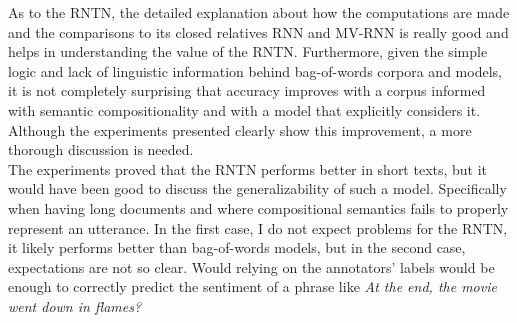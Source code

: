 \documentclass[11pt,a4paper]{article}
\begin{document}
As to the RNTN, the detailed explanation about how the computations are made and the comparisons to its closed relatives RNN and MV-RNN is really good and helps in understanding the value of the RNTN. Furthermore, given the simple logic and lack of linguistic information behind bag-of-words corpora and models, it is not completely surprising that accuracy improves with a corpus informed with semantic compositionality and with a model that explicitly considers it. Although the experiments presented clearly show this improvement, a more thorough discussion is needed.\\

The experiments proved that the RNTN performs better in short texts, but it would have been good to discuss the generalizability of such a model. Specifically when having long documents and where compositional semantics fails to properly represent an utterance. In the first case, I do not expect problems for the RNTN, it likely performs better than bag-of-words models, but in the second case, expectations are not so clear. Would relying on the annotators' labels would be enough to correctly predict the sentiment of a phrase like \textit{At the end, the movie went down in flames?}\\   

\nocite{*}


\end{document}
